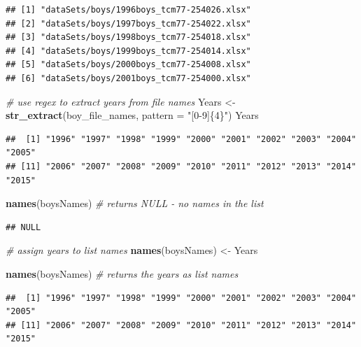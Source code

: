 \documentclass[
]{book}
\newenvironment{Shaded}{\begin{snugshade}}{\end{snugshade}}
\newcommand{\CommentTok}[1]{\textcolor[rgb]{0.56,0.35,0.01}{\textit{#1}}}
\newcommand{\DataTypeTok}[1]{\textcolor[rgb]{0.13,0.29,0.53}{#1}}
\newcommand{\KeywordTok}[1]{\textcolor[rgb]{0.13,0.29,0.53}{\textbf{#1}}}
\newcommand{\NormalTok}[1]{#1}
\newcommand{\StringTok}[1]{\textcolor[rgb]{0.31,0.60,0.02}{#1}}
\begin{document}
\begin{verbatim}
## [1] "dataSets/boys/1996boys_tcm77-254026.xlsx"
## [2] "dataSets/boys/1997boys_tcm77-254022.xlsx"
## [3] "dataSets/boys/1998boys_tcm77-254018.xlsx"
## [4] "dataSets/boys/1999boys_tcm77-254014.xlsx"
## [5] "dataSets/boys/2000boys_tcm77-254008.xlsx"
## [6] "dataSets/boys/2001boys_tcm77-254000.xlsx"
\end{verbatim}

\begin{Shaded}
\begin{Highlighting}[]
\CommentTok{\# use regex to extract years from file names}
\NormalTok{Years \textless{}{-}}\StringTok{ }\KeywordTok{str\_extract}\NormalTok{(boy\_file\_names, }\DataTypeTok{pattern =} \StringTok{"[0{-}9]\{4\}"}\NormalTok{)}
\NormalTok{Years}
\end{Highlighting}
\end{Shaded}

\begin{verbatim}
##  [1] "1996" "1997" "1998" "1999" "2000" "2001" "2002" "2003" "2004" "2005"
## [11] "2006" "2007" "2008" "2009" "2010" "2011" "2012" "2013" "2014" "2015"
\end{verbatim}

\begin{Shaded}
\begin{Highlighting}[]
\KeywordTok{names}\NormalTok{(boysNames) }\CommentTok{\# returns NULL {-} no names in the list}
\end{Highlighting}
\end{Shaded}

\begin{verbatim}
## NULL
\end{verbatim}

\begin{Shaded}
\begin{Highlighting}[]
\CommentTok{\# assign years to list names}
\KeywordTok{names}\NormalTok{(boysNames) \textless{}{-}}\StringTok{ }\NormalTok{Years }

\KeywordTok{names}\NormalTok{(boysNames) }\CommentTok{\# returns the years as list names}
\end{Highlighting}
\end{Shaded}

\begin{verbatim}
##  [1] "1996" "1997" "1998" "1999" "2000" "2001" "2002" "2003" "2004" "2005"
## [11] "2006" "2007" "2008" "2009" "2010" "2011" "2012" "2013" "2014" "2015"
\end{verbatim}
\end{document}
